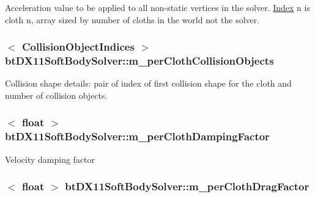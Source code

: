 Acceleration value to be applied to all non-\/static vertices in the solver. \hyperlink{struct_index}{Index} n is cloth n, array sized by number of cloths in the world not the solver. \hypertarget{classbt_d_x11_soft_body_solver_ac1cc32f59266490db75cd5a6ace3ffe8}{
\subsubsection[{m\+\_\+per\+Cloth\+Collision\+Objects}]{$<$ {\bf Collision\+Object\+Indices} $>$ bt\+D\+X11\+Soft\+Body\+Solver\+::m\+\_\+per\+Cloth\+Collision\+Objects\hspace{0.3cm}{\ttfamily [protected]}}}\label{classbt_d_x11_soft_body_solver_ac1cc32f59266490db75cd5a6ace3ffe8}
Collision shape details\+: pair of index of first collision shape for the cloth and number of collision objects. \hypertarget{classbt_d_x11_soft_body_solver_a57e1ce28a6d9ffd31bb4a29b8071e84d}{
\subsubsection[{m\+\_\+per\+Cloth\+Damping\+Factor}]{$<$ float $>$ bt\+D\+X11\+Soft\+Body\+Solver\+::m\+\_\+per\+Cloth\+Damping\+Factor\hspace{0.3cm}{\ttfamily [protected]}}}\label{classbt_d_x11_soft_body_solver_a57e1ce28a6d9ffd31bb4a29b8071e84d}
Velocity damping factor \hypertarget{classbt_d_x11_soft_body_solver_a0ce074a16d65c6b814ee4fb6ab9ccb27}{
\subsubsection[{m\+\_\+per\+Cloth\+Drag\+Factor}]{$<$ float $>$ bt\+D\+X11\+Soft\+Body\+Solver\+::m\+\_\+per\+Cloth\+Drag\+Factor\hspace{0.3cm}{\ttfamily [protected]}}}\label{classbt_d_x11_soft_body_solver_a0ce074a16d65c6b814ee4fb6ab9ccb27}
